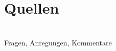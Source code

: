 \documentclass[aspectratio=1610, professionalfonts, 9pt]{beamer}
\begin{document}
\section{Quellen}
\begin{frame}
  \printbibliography
\end{frame}
\section{}
\begin{frame}
  \centering
  \Huge
  Fragen, Anregungen, Kommentare
\end{frame}
\end{document}
